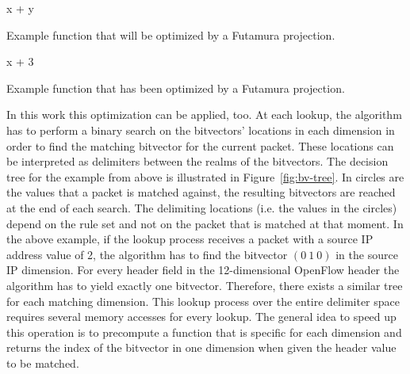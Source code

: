 \documentclass[a4paper,
		12pt,
		parskip=full,
		titlepage
		]{scrartcl}
\begin{document}
\begin{algorithm}
\begin{algorithmic}[1]
    \State \Return x + y
\EndFunction
\end{algorithmic}
\caption{Example function that will be optimized by a Futamura projection.}
\label{alg:futamura-f}
\end{algorithm}

\begin{algorithm}
\begin{algorithmic}[1]
    \State \Return x + 3
\EndFunction
\end{algorithmic}
\caption{Example function that has been optimized by a Futamura projection.}
\label{alg:futamura-f-optimized}
\end{algorithm}

In this work this optimization can be applied, too.
At each lookup, the algorithm has to perform a binary search on the bitvectors' 
locations in each dimension in order to find the matching bitvector for the current packet.
These locations can be interpreted as delimiters between the realms of the bitvectors.
The decision tree for the example from above is illustrated in Figure~\ref{fig:bv-tree}.
In circles are the values that a packet is matched against, the resulting bitvectors are reached at the end of each search. 
The delimiting locations (i.e. the values in the circles) depend on the 
rule set and not on the packet that is matched at that moment.
In the above example, if the lookup process receives a packet with a source IP 
address value of 2, the algorithm has to find the bitvector $(0\ 1\ 0)$ in the source IP dimension.
For every header field in the 12-dimensional OpenFlow header the algorithm has to yield exactly one bitvector.
Therefore, there exists a similar tree for each matching dimension.
This lookup process over the entire delimiter space requires several memory accesses for every lookup.
The general idea to speed up this operation is to precompute a function that 
is specific for each dimension and returns the index of the bitvector in one 
dimension when given the header value to be matched.
\end{document}
